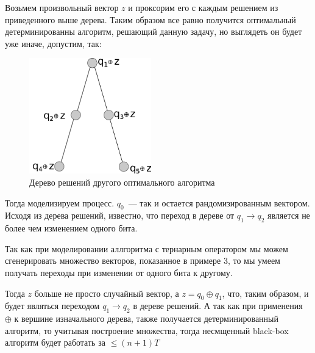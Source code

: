 Возьмем произвольный вектор $z$ и проксорим его с каждым решением из приведенного выше дерева. Таким образом все равно получится оптимальный детерминированны алгоритм, решающий данную задачу, но выглядеть 
он будет уже иначе, допустим, так: 

\begin{figure}[H]
\centering
\includegraphics[height=5cm]{pic/graph2.png}
\caption{Дерево решений другого оптимального алгоритма}
\end{figure}

Тогда моделизируем процесс. 
$q_0$~--- так и остается рандомизированным вектором.
Исходя из дерева решений, известно, что переход в дереве от $q_1 \to q_2$ является не более чем изменением одного бита. 

Так как при моделировании аллгоритма с тернарным оператором мы можем сгенерировать множество векторов, показанное в примере 3, то мы умеем получать переходы при изменении от одного бита к другому. 

Тогда $z$ больше не просто случайный вектор, а $z = q_0 \oplus q_1 $, что, таким образом, и будет являться переходом $q_1 \to q_2$ в дереве решений. А так как при применения $\oplus$ к вершине 
изначального дерева, также получается детерминированный алгоритм, то учитывая построение множества, тогда несмщенный black-box алгоритм будет работать за $\leq(n + 1)T$
